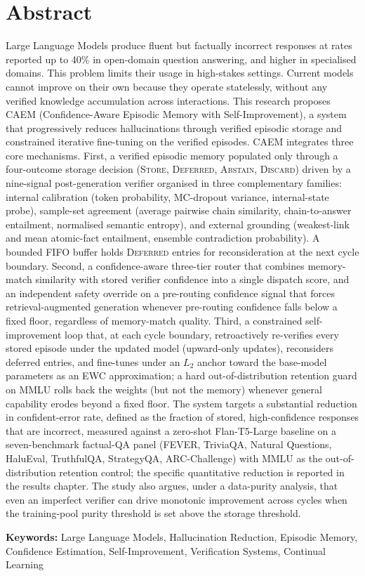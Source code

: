 \chapter*{Abstract}
Large Language Models produce fluent but factually incorrect responses at rates reported up to 40\% in open-domain question answering, and higher in specialised domains. This problem limits their usage in high-stakes settings. Current models cannot improve on their own because they operate statelessly, without any verified knowledge accumulation across interactions. This research proposes CAEM (Confidence-Aware Episodic Memory with Self-Improvement), a system that progressively reduces hallucinations through verified episodic storage and constrained iterative fine-tuning on the verified episodes. CAEM integrates three core mechanisms. First, a verified episodic memory populated only through a four-outcome storage decision (\textsc{Store}, \textsc{Deferred}, \textsc{Abstain}, \textsc{Discard}) driven by a nine-signal post-generation verifier organised in three complementary families: internal calibration (token probability, MC-dropout variance, internal-state probe), sample-set agreement (average pairwise chain similarity, chain-to-answer entailment, normalised semantic entropy), and external grounding (weakest-link and mean atomic-fact entailment, ensemble contradiction probability). A bounded FIFO buffer holds \textsc{Deferred} entries for reconsideration at the next cycle boundary. Second, a confidence-aware three-tier router that combines memory-match similarity with stored verifier confidence into a single dispatch score, and an independent safety override on a pre-routing confidence signal that forces retrieval-augmented generation whenever pre-routing confidence falls below a fixed floor, regardless of memory-match quality. Third, a constrained self-improvement loop that, at each cycle boundary, retroactively re-verifies every stored episode under the updated model (upward-only updates), reconsiders deferred entries, and fine-tunes under an $L_2$ anchor toward the base-model parameters as an EWC approximation; a hard out-of-distribution retention guard on MMLU rolls back the weights (but not the memory) whenever general capability erodes beyond a fixed floor. The system targets a substantial reduction in confident-error rate, defined as the fraction of stored, high-confidence responses that are incorrect, measured against a zero-shot Flan-T5-Large baseline on a seven-benchmark factual-QA panel (FEVER, TriviaQA, Natural Questions, HaluEval, TruthfulQA, StrategyQA, ARC-Challenge) with MMLU as the out-of-distribution retention control; the specific quantitative reduction is reported in the results chapter. The study also argues, under a data-purity analysis, that even an imperfect verifier can drive monotonic improvement across cycles when the training-pool purity threshold is set above the storage threshold.


\vspace{0.5cm}

\noindent\textbf{Keywords:} Large Language Models, Hallucination Reduction, Episodic Memory, Confidence Estimation, Self-Improvement, Verification Systems, Continual Learning